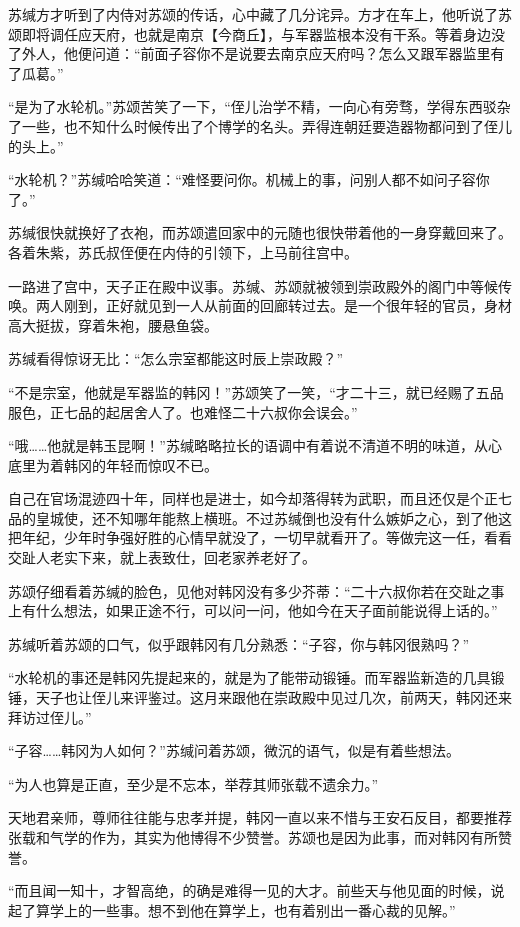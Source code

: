 苏缄方才听到了内侍对苏颂的传话，心中藏了几分诧异。方才在车上，他听说了苏颂即将调任应天府，也就是南京【今商丘】，与军器监根本没有干系。等着身边没了外人，他便问道：“前面子容你不是说要去南京应天府吗？怎么又跟军器监里有了瓜葛。”

“是为了水轮机。”苏颂苦笑了一下，“侄儿治学不精，一向心有旁骛，学得东西驳杂了一些，也不知什么时候传出了个博学的名头。弄得连朝廷要造器物都问到了侄儿的头上。”

“水轮机？”苏缄哈哈笑道：“难怪要问你。机械上的事，问别人都不如问子容你了。”

苏缄很快就换好了衣袍，而苏颂遣回家中的元随也很快带着他的一身穿戴回来了。各着朱紫，苏氏叔侄便在内侍的引领下，上马前往宫中。

一路进了宫中，天子正在殿中议事。苏缄、苏颂就被领到崇政殿外的阁门中等候传唤。两人刚到，正好就见到一人从前面的回廊转过去。是一个很年轻的官员，身材高大挺拔，穿着朱袍，腰悬鱼袋。

苏缄看得惊讶无比：“怎么宗室都能这时辰上崇政殿？”

“不是宗室，他就是军器监的韩冈！”苏颂笑了一笑，“才二十三，就已经赐了五品服色，正七品的起居舍人了。也难怪二十六叔你会误会。”

“哦……他就是韩玉昆啊！”苏缄略略拉长的语调中有着说不清道不明的味道，从心底里为着韩冈的年轻而惊叹不已。

自己在官场混迹四十年，同样也是进士，如今却落得转为武职，而且还仅是个正七品的皇城使，还不知哪年能熬上横班。不过苏缄倒也没有什么嫉妒之心，到了他这把年纪，少年时争强好胜的心情早就没了，一切早就看开了。等做完这一任，看看交趾人老实下来，就上表致仕，回老家养老好了。

苏颂仔细看着苏缄的脸色，见他对韩冈没有多少芥蒂：“二十六叔你若在交趾之事上有什么想法，如果正途不行，可以问一问，他如今在天子面前能说得上话的。”

苏缄听着苏颂的口气，似乎跟韩冈有几分熟悉：“子容，你与韩冈很熟吗？”

“水轮机的事还是韩冈先提起来的，就是为了能带动锻锤。而军器监新造的几具锻锤，天子也让侄儿来评鉴过。这月来跟他在崇政殿中见过几次，前两天，韩冈还来拜访过侄儿。”

“子容……韩冈为人如何？”苏缄问着苏颂，微沉的语气，似是有着些想法。

“为人也算是正直，至少是不忘本，举荐其师张载不遗余力。”

天地君亲师，尊师往往能与忠孝并提，韩冈一直以来不惜与王安石反目，都要推荐张载和气学的作为，其实为他博得不少赞誉。苏颂也是因为此事，而对韩冈有所赞誉。

“而且闻一知十，才智高绝，的确是难得一见的大才。前些天与他见面的时候，说起了算学上的一些事。想不到他在算学上，也有着别出一番心裁的见解。”

